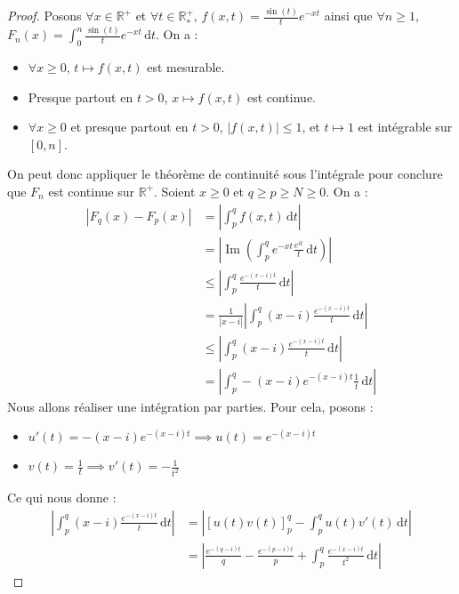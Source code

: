   \begin{proof}
    Posons $\forall x \in \mathbb{R}^+$ et $\forall t \in \mathbb{R}^+_*$, $f(x,t) = \frac{\sin(t)}{t} e^{-xt}$ ainsi que $\forall n \geq 1$, $F_n(x) = \int_0^n \frac{\sin(t)}{t} e^{-xt} \, \mathrm{d}t$. On a :
    \begin{itemize}
      \item $\forall x \geq 0$, $t \mapsto f(x, t)$ est mesurable.
      \item Presque partout en $t > 0$, $x \mapsto f(x, t)$ est continue.
      \item $\forall x \geq 0$ et presque partout en $t > 0$, $|f(x,t)| \leq 1$, et $t \mapsto 1$ est intégrable sur $[0,n]$.
    \end{itemize}
    On peut donc appliquer le théorème de continuité sous l'intégrale pour conclure que $F_n$ est continue sur $\mathbb{R}^+$.
    \newpar
    Soient $x \geq 0$ et $q \geq p \geq N \geq 0$. On a :
    \begin{align*}
      |F_q(x) - F_p(x)| &= \left| \int_p^q f(x,t) \, \mathrm{d}t \right| \\
      &= \left| \operatorname{Im} \left( \int_p^q e^{-xt} \frac{e^{it}}{t} \, \mathrm{d}t \right) \right| \\
      &\leq \left| \int_p^q \frac{e^{-(x-i)t}}{t} \, \mathrm{d}t \right| \\
      &= \frac{1}{|x-i|} \left| \int_p^q (x-i) \frac{e^{-(x-i)t}}{t} \, \mathrm{d}t \right| \\
      &\leq \left| \int_p^q (x-i) \frac{e^{-(x-i)t}}{t} \, \mathrm{d}t \right| \\
      &= \left| \int_p^q -(x-i) e^{-(x-i)t} \frac{1}{t} \, \mathrm{d}t \right|
    \end{align*}
    Nous allons réaliser une intégration par parties. Pour cela, posons :
    \begin{itemize}
      \item $u'(t) = -(x-i) e^{-(x-i)t} \implies u(t) = e^{-(x-i)t}$
      \item $v(t) = \frac{1}{t} \implies v'(t) = -\frac{1}{t^2}$
    \end{itemize}
    Ce qui nous donne :
    \begin{align*}
      \left| \int_p^q (x-i) \frac{e^{-(x-i)t}}{t} \, \mathrm{d}t \right| &= \left| \left[ u(t)v(t) \right]_p^q - \int_p^q u(t) v'(t) \, \mathrm{d}t \right| \\
      &= \left| \frac{e^{-(q-i)t}}{q} - \frac{e^{-(p-i)t}}{p} +  \int_p^q \frac{e^{-(x-i)t}}{t^2} \, \mathrm{d}t \right|

\end{align*}
\end{proof}
